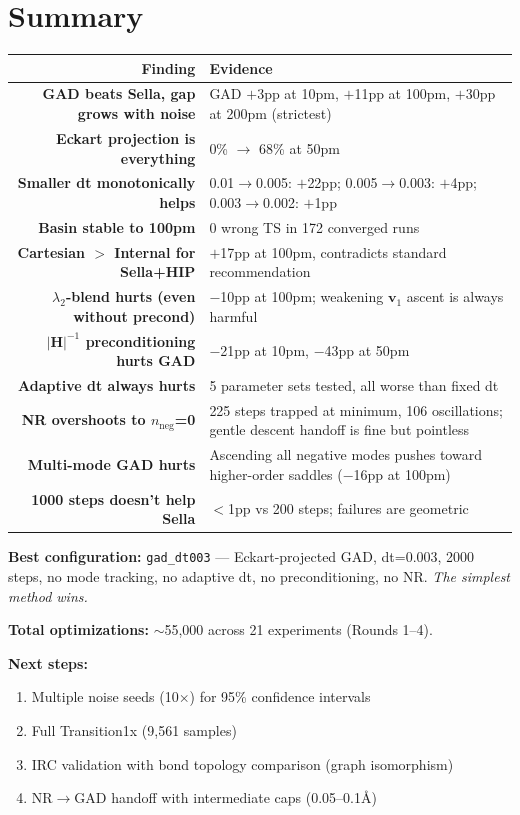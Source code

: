 \documentclass[11pt]{article}
\begin{document}
\section*{Summary}

\begin{center}
\begin{tabular}{rl}
\toprule
Finding & Evidence \\
\midrule
\textbf{GAD beats Sella, gap grows with noise} & GAD $+$3pp at 10pm, $+$11pp at 100pm, $+$30pp at 200pm (strictest) \\
\textbf{Eckart projection is everything} & 0\% $\to$ 68\% at 50pm \\
\textbf{Smaller dt monotonically helps} & 0.01$\to$0.005: $+$22pp; 0.005$\to$0.003: $+$4pp; 0.003$\to$0.002: $+$1pp \\
\textbf{Basin stable to 100pm} & 0 wrong TS in 172 converged runs \\
\textbf{Cartesian $>$ Internal for Sella+HIP} & $+$17pp at 100pm, contradicts standard recommendation \\
\textbf{$\lambda_2$-blend hurts (even without precond)} & $-$10pp at 100pm; weakening $\mathbf{v}_1$ ascent is always harmful \\
\textbf{$|\mathbf{H}|^{-1}$ preconditioning hurts GAD} & $-$21pp at 10pm, $-$43pp at 50pm \\
\textbf{Adaptive dt always hurts} & 5 parameter sets tested, all worse than fixed dt \\
\textbf{NR overshoots to $n_{\text{neg}}$=0} & 225 steps trapped at minimum, 106 oscillations; gentle descent handoff is fine but pointless \\
\textbf{Multi-mode GAD hurts} & Ascending all negative modes pushes toward higher-order saddles ($-$16pp at 100pm) \\
\textbf{1000 steps doesn't help Sella} & $<$1pp vs 200 steps; failures are geometric \\
\bottomrule
\end{tabular}
\end{center}

\textbf{Best configuration:}
\texttt{gad\_dt003} --- Eckart-projected GAD, dt=0.003, 2000 steps, no mode tracking,
no adaptive dt, no preconditioning, no NR. \textit{The simplest method wins.}

\textbf{Total optimizations:} $\sim$55,000 across 21 experiments (Rounds 1--4).

\textbf{Next steps:}
\begin{enumerate}[nosep,leftmargin=1.5em]
\item Multiple noise seeds (10$\times$) for 95\% confidence intervals
\item Full Transition1x (9,561 samples)
\item IRC validation with bond topology comparison (graph isomorphism)
\item NR$\to$GAD handoff with intermediate caps (0.05--0.1\AA)
\end{enumerate}
\end{document}
